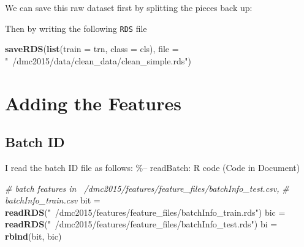 \documentclass[10pt]{report}
\newenvironment{Shaded}{}{}
\newcommand{\KeywordTok}[1]{\textcolor[rgb]{0.00,0.44,0.13}{\textbf{{#1}}}}
\newcommand{\DataTypeTok}[1]{\textcolor[rgb]{0.56,0.13,0.00}{{#1}}}
\newcommand{\StringTok}[1]{\textcolor[rgb]{0.25,0.44,0.63}{{#1}}}
\newcommand{\CommentTok}[1]{\textcolor[rgb]{0.38,0.63,0.69}{\textit{{#1}}}}
\newcommand{\NormalTok}[1]{{#1}}
\begin{document}
We can save this raw dataset first by splitting the pieces back up:

\begin{Shaded}
\end{Shaded}

Then by writing the following \verb!RDS! file

\begin{Shaded}
\begin{Highlighting}[]
\KeywordTok{saveRDS}\NormalTok{(}\KeywordTok{list}\NormalTok{(}\DataTypeTok{train =} \NormalTok{trn, }\DataTypeTok{class =} \NormalTok{cls), }\DataTypeTok{file =} \StringTok{"~/dmc2015/data/clean_data/clean_simple.rds"}\NormalTok{)}
\end{Highlighting}
\end{Shaded}

\section{Adding the Features}\label{adding-the-features}

\subsection{Batch ID}\label{batch-id}

I read the batch ID file as follows: \%-- readBatch: R code (Code in
Document)

\begin{Shaded}
\begin{Highlighting}[]
\CommentTok{# batch features in ~/dmc2015/features/feature_files/batchInfo_test.csv,}
\CommentTok{# batchInfo_train.csv}
\NormalTok{bit =}\StringTok{ }\KeywordTok{readRDS}\NormalTok{(}\StringTok{"~/dmc2015/features/feature_files/batchInfo_train.rds"}\NormalTok{)}
\NormalTok{bic =}\StringTok{ }\KeywordTok{readRDS}\NormalTok{(}\StringTok{"~/dmc2015/features/feature_files/batchInfo_test.rds"}\NormalTok{)}
\NormalTok{bi =}\StringTok{ }\KeywordTok{rbind}\NormalTok{(bit, bic)}
\end{Highlighting}
\end{Shaded}
\end{document}
